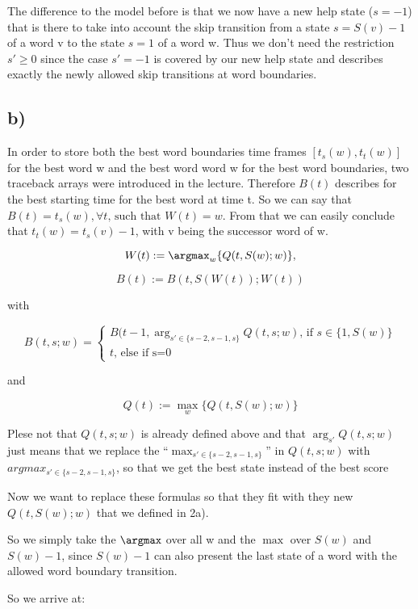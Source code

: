 The difference to the model before is that we now have a new help state ($s = - 1$) that is there to take into account the skip transition 
from a state $s = S(v) - 1$ of a word v to the state $s=1$ of a word w. Thus we don't need the restriction $s' \geq 0$ since the case $s' = -1$ is
covered by our new help state and describes exactly the newly allowed skip transitions at word boundaries.


\subsection*{b)} %
\label{sub:b}

In order to store both the best word boundaries time frames $[t_{s}(w),t_{t}(w)]$ for the best word w and the best word word w for the best word boundaries, two 
traceback arrays were introduced in the lecture. Therefore $B(t)$ describes for the best starting time for the best word at time t. So we can say that $B(t) = 
t_{s}(w), \forall t \text{, such that } W(t) = w$. From that we can easily conclude that $t_{t}(w) = t_{s}(v) - 1$, with v being the successor word of w.

\[
W(t) := \argmax_w\{Q(t,S(w);w)\},
\]

\[
B(t) := B(t,S(W(t));W(t))
\]

with 

\[
B(t,s;w) = 
\begin{cases}
	B(t-1,\arg_{s' \in \{ s-2, s-1, s\}}Q(t,s;w) \text{, if } s \in \{1,S(w)\} \\
	t \text{, else if s=0}
\end{cases}
\]

and 

\[
Q(t) := \max_w\{Q(t,S(w);w)\}
\]


Plese not that $Q(t,s;w)$ is already defined above and that $\arg_{s'}Q(t,s;w)$ just means that we replace the ``$\max_{s' \in \{ s-2, s-1, s\}}$'' in 
$Q(t,s;w)$ with $argmax_{s' \in \{ s-2, s-1, s\}}$, so that we get the best state instead of the best score

Now we want to replace these formulas so that they fit with they new $Q(t,S(w);w)$ that we defined in 2a).

So we simply take the $\argmax$ over all w and the $\max$ over $S(w)$ and $S(w) - 1$, since $S(w) - 1$ can also present the last state of a word
with the allowed word boundary transition.

So we arrive at: 

